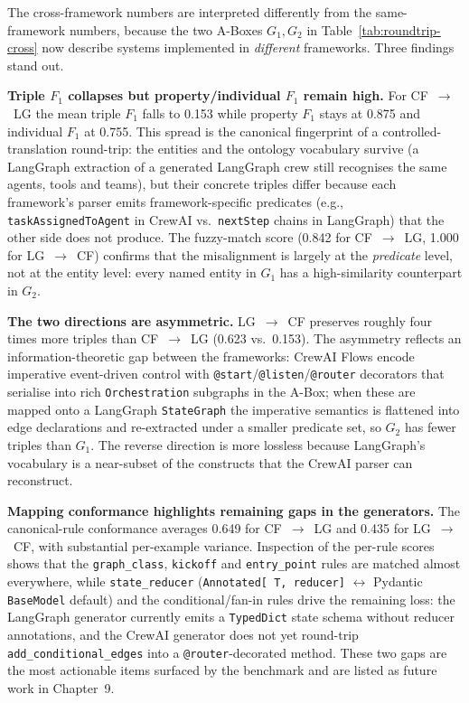 The cross-framework numbers are interpreted differently from the
same-framework numbers, because the two A-Boxes $G_1, G_2$ in
Table~\ref{tab:roundtrip-cross} now describe systems implemented in
\emph{different} frameworks. Three findings stand out.

\textbf{Triple $F_1$ collapses but property/individual $F_1$ remain
high.} For CF~$\to$~LG the mean triple $F_1$ falls to 0.153 while
property $F_1$ stays at 0.875 and individual $F_1$ at 0.755. This
spread is the canonical fingerprint of a controlled-translation
round-trip: the entities and the ontology vocabulary survive (a
LangGraph extraction of a generated LangGraph crew still recognises
the same agents, tools and teams), but their concrete triples differ
because each framework's parser emits framework-specific predicates
(e.g., \texttt{taskAssignedToAgent} in CrewAI vs.\
\texttt{nextStep} chains in LangGraph) that the other side does not
produce. The fuzzy-match score (0.842 for CF~$\to$~LG, 1.000 for
LG~$\to$~CF) confirms that the misalignment is largely at the
\emph{predicate} level, not at the entity level: every named entity
in $G_1$ has a high-similarity counterpart in $G_2$.

\textbf{The two directions are asymmetric.} LG~$\to$~CF preserves
roughly four times more triples than CF~$\to$~LG (0.623 vs.\ 0.153).
The asymmetry reflects an information-theoretic gap between the
frameworks: CrewAI Flows encode imperative event-driven control with
\texttt{@start}/\texttt{@listen}/\texttt{@router} decorators that
serialise into rich \texttt{Orchestration} subgraphs in the A-Box;
when these are mapped onto a LangGraph \texttt{StateGraph} the
imperative semantics is flattened into edge declarations and
re-extracted under a smaller predicate set, so $G_2$ has fewer
triples than $G_1$. The reverse direction is more lossless because
LangGraph's vocabulary is a near-subset of the constructs that the
CrewAI parser can reconstruct.

\textbf{Mapping conformance highlights remaining gaps in the
generators.} The canonical-rule conformance averages 0.649 for
CF~$\to$~LG and 0.435 for LG~$\to$~CF, with substantial per-example
variance. Inspection of the per-rule scores shows that the
\texttt{graph\_class}, \texttt{kickoff} and \texttt{entry\_point}
rules are matched almost everywhere, while \texttt{state\_reducer}
(\texttt{Annotated[\,T,\,reducer]} $\leftrightarrow$ Pydantic
\texttt{BaseModel} default) and the conditional/fan-in rules drive
the remaining loss: the LangGraph generator currently emits a
\texttt{TypedDict} state schema without reducer annotations, and the
CrewAI generator does not yet round-trip
\texttt{add\_conditional\_edges} into a \texttt{@router}-decorated
method. These two gaps are the most actionable items surfaced by the
benchmark and are listed as future work in Chapter~9.

